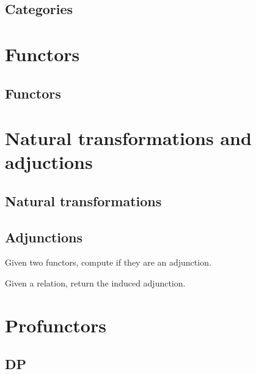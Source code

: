 \section{Categories}





\chapter{Functors}


\section{Functors}




\chapter{Natural transformations and adjuctions}


\section{Natural transformations}




\section{Adjunctions}

\begin{exercise}
  Given two functors, compute if they are an adjunction.
\end{exercise}

\begin{exercise}
  Given a relation, return the induced adjunction.
\end{exercise}


\chapter{Profunctors}


\section{DP}

